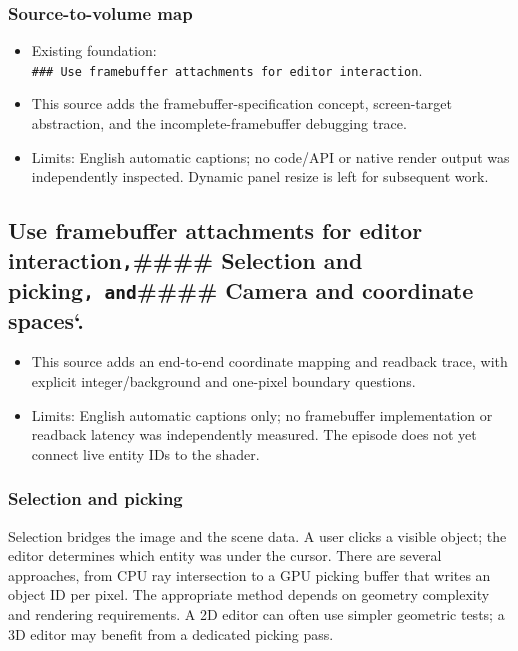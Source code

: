 \subsubsection{Source-to-volume map}\label{06-engine-ii-ch032-source-to-volume-map-4}

\begin{itemize}
\tightlist
\item
  Existing foundation: \texttt{\#\#\#\ Use\ framebuffer\ attachments\ for\ editor\ interaction}.
\item
  This source adds the framebuffer-specification concept, screen-target abstraction, and the incomplete-framebuffer debugging trace.
\item
  Limits: English automatic captions; no code/API or native render output was independently inspected. Dynamic panel resize is left for subsequent work.
\end{itemize}

\subsection{\texorpdfstring{Use framebuffer attachments for editor interaction\texttt{,}\#\#\#\# Selection and picking\texttt{,\ and}\#\#\#\# Camera and coordinate spaces`.}{Use framebuffer attachments for editor interaction,\#\#\#\# Selection and picking, and\#\#\#\# Camera and coordinate spaces`.}}\label{06-engine-ii-ch032-use-framebuffer-attachments-for-editor-interaction-selection-and-picking-and-camera-and-coordinate-spaces.}

\begin{itemize}
\tightlist
\item
  This source adds an end-to-end coordinate mapping and readback trace, with explicit integer/background and one-pixel boundary questions.
\item
  Limits: English automatic captions only; no framebuffer implementation or readback latency was independently measured. The episode does not yet connect live entity IDs to the shader.
\end{itemize}

\subsubsection{Selection and picking}\label{06-engine-ii-ch032-selection-and-picking}

Selection bridges the image and the scene data. A user clicks a visible object; the editor determines which entity was under the cursor. There are several approaches, from CPU ray intersection to a GPU picking buffer that writes an object ID per pixel. The appropriate method depends on geometry complexity and rendering requirements. A 2D editor can often use simpler geometric tests; a 3D editor may benefit from a dedicated picking pass.

